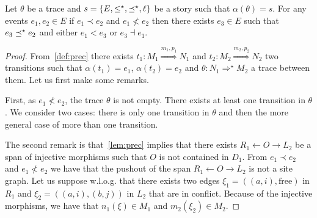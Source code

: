 \begin{lemma}
  Let $\theta$ be a trace and $s=\{E,\leq^{\star},\preceq^{\star},\ell\}$ be a story such that $\alpha(\theta) = s$. For any events $e_1,e_2\in E$ if $e_1\prec e_2$ and $e_1\not< e_2$ then there exists $e_3\in E$ such that $e_3\preceq^{\star} e_2$ and either $e_1< e_3$ or $e_3\dashv e_1$.
\end{lemma}
\begin{proof}
  From~\autoref{def:prec} there exists $t_1:M_1\overset{m_1,p_1}{\Rightarrow} N_1$ and $t_2:M_2\overset{m_2,p_2}{\Rightarrow} N_2$ two transitions such that $\alpha(t_1)=e_1$, $\alpha(t_2)=e_2$ and $\theta:N_1\Rightarrow^{\star}M_2$ a trace between them. Let us first make some remarks.

  First, as $e_1\not< e_2$, the trace $\theta$ is not empty. There exists at least one transition in $\theta$. We consider two cases: there is only one transition in $\theta$ and then the more general case of more than one transition.

  The second remark is that~\autoref{lem:prec} implies that there exists $R_1\leftarrow O\rightarrow L_2$ be a span of injective morphisms such that $O$ is not contained in $D_1$. From $e_1\prec e_2$ and $e_1\not< e_2$ we have that the pushout of the span $R_1\leftarrow O\rightarrow L_2$ is not a site graph. Let us suppose w.l.o.g. that there exists two edges $\xi_1=((a,i), \text{free})$ in $R_1$ and $\xi_2=((a,i),(b,j))$ in $L_2$ that are in conflict. Because of the injective morphisms, we have that $n_1(\xi) \in M_1$ and $m_2(\xi_2)\in M_2$.


\end{proof}
